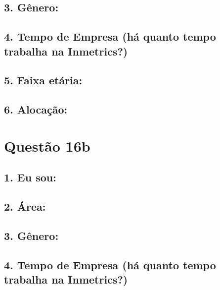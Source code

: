 \documentclass[]{book}
\begin{document}
\hypertarget{genero-29}{%
\subsection{3. Gênero:}\label{genero-29}}

\hypertarget{tempo-de-empresa-ha-quanto-tempo-trabalha-na-inmetrics-29}{%
\subsection{4. Tempo de Empresa (há quanto tempo trabalha na Inmetrics?)}\label{tempo-de-empresa-ha-quanto-tempo-trabalha-na-inmetrics-29}}

\hypertarget{faixa-etaria-29}{%
\subsection{5. Faixa etária:}\label{faixa-etaria-29}}

\hypertarget{alocacao-29}{%
\subsection{6. Alocação:}\label{alocacao-29}}

\hypertarget{questao-16b}{%
\section{Questão 16b}\label{questao-16b}}

\hypertarget{eu-sou-30}{%
\subsection{1. Eu sou:}\label{eu-sou-30}}

\hypertarget{area-30}{%
\subsection{2. Área:}\label{area-30}}

\hypertarget{genero-30}{%
\subsection{3. Gênero:}\label{genero-30}}

\hypertarget{tempo-de-empresa-ha-quanto-tempo-trabalha-na-inmetrics-30}{%
\subsection{4. Tempo de Empresa (há quanto tempo trabalha na Inmetrics?)}\label{tempo-de-empresa-ha-quanto-tempo-trabalha-na-inmetrics-30}}
\end{document}
